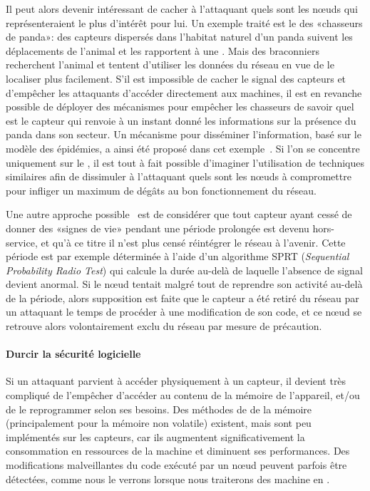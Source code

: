 Il peut alors devenir intéressant de cacher à l'attaquant quels sont les nœuds qui représenteraient le plus d'intérêt pour lui.
Un exemple traité est le  des «chasseurs de panda»: des capteurs dispersés dans l'habitat naturel d'un panda suivent les déplacements de l'animal et les rapportent à une \sdb.
Mais des braconniers recherchent l'animal et tentent d'utiliser les données du réseau en vue de le localiser plus facilement.
S'il est impossible de cacher le signal des capteurs et d'empêcher les attaquants d'accéder directement aux machines, il est en revanche possible de déployer des mécanismes pour empêcher les chasseurs de savoir quel est le capteur qui renvoie à un instant donné les informations sur la présence du panda dans son secteur.
Un mécanisme pour disséminer l'information, basé sur le modèle des épidémies, a ainsi été proposé dans cet exemple~\cite{KDA14}.
Si l'on se concentre uniquement sur le \dds, il est tout à fait possible d'imaginer l'utilisation de techniques similaires afin de dissimuler à l'attaquant quels sont les nœuds à compromettre pour infliger un maximum de dégâts au bon fonctionnement du réseau.

Une autre approche possible~\cite{Ho10} est de considérer que tout capteur ayant cessé de donner des «signes de vie» pendant une période prolongée est devenu hors-service, et qu'à ce titre il n'est plus censé réintégrer le réseau à l'avenir.
Cette période est par exemple déterminée à l'aide d'un algorithme SPRT (\textit{Sequential Probability Radio Test}) qui calcule la durée au-delà de laquelle l'absence de signal devient anormal.
Si le nœud tentait malgré tout de reprendre son activité au-delà de la période, alors supposition est faite que le capteur a été retiré du réseau par un attaquant le temps de procéder à une modification de son code, et ce nœud se retrouve alors volontairement exclu du réseau par mesure de précaution.

\paragraph{Durcir la sécurité logicielle}
Si un attaquant parvient à accéder physiquement à un capteur, il devient très compliqué de l'empêcher d'accéder au contenu de la mémoire de l'appareil, et/ou de le reprogrammer selon ses besoins.
Des méthodes de  de la mémoire (principalement pour la mémoire non volatile) existent, mais sont peu implémentés sur les capteurs, car ils augmentent significativement la consommation en ressources de la machine et diminuent ses performances.
Des modifications malveillantes du code exécuté par un nœud peuvent parfois être détectées, comme nous le verrons lorsque nous traiterons des \idss machine en .

